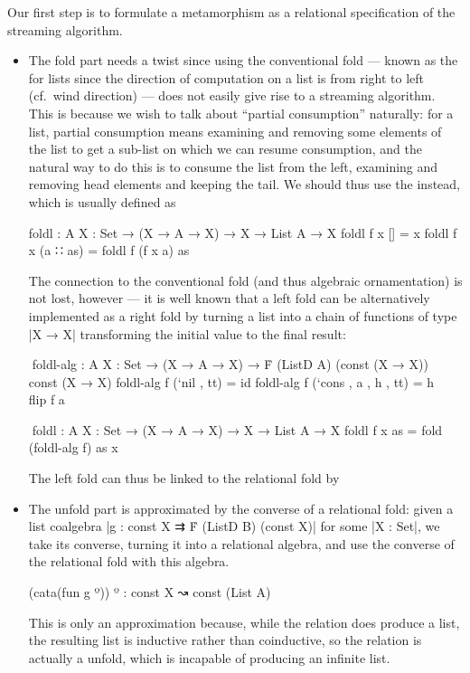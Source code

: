 Our first step is to formulate a metamorphism as a relational specification of the streaming algorithm.
\begin{itemize}
\item The fold part needs a twist since using the conventional fold --- known as the  for lists since the direction of computation on a list is from right to left (cf.~wind direction) --- does not easily give rise to a streaming algorithm.
This is because we wish to talk about ``partial consumption'' naturally: for a list, partial consumption means examining and removing some elements of the list to get a sub-list on which we can resume consumption, and the natural way to do this is to consume the list from the left, examining and removing head elements and keeping the tail.
We should thus use the  instead, which is usually defined as
\begin{code}
foldl : {A X : Set} → (X → A → X) → X → List A → X
foldl f x []        = x
foldl f x (a ∷ as)  = foldl f (f x a) as
\end{code}
The connection to the conventional fold (and thus algebraic ornamentation) is not lost, however --- it is well known that a left fold can be alternatively implemented as a right fold by turning a list into a chain of functions of type |X → X| transforming the initial value to the final result:
\begin{code}
^^^foldl-alg :  {A X : Set} → (X → A → X) →
                Ḟ (ListD A) (const (X → X)) ⇉ const (X → X)
foldl-alg f (`nil   ,          tt) = id
foldl-alg f (`cons  , a , h ,  tt) = h ∘ flip f a

^^^foldl : {A X : Set} → (X → A → X) → X → List A → X
foldl f x as = fold (foldl-alg f) as x
\end{code}
The left fold can thus be linked to the relational fold by
\item The unfold part is approximated by the converse of a relational fold: given a list coalgebra |g : const X ⇉ Ḟ (ListD B) (const X)| for some |X : Set|, we take its converse, turning it into a relational algebra, and use the converse of the relational fold with this algebra.
\begin{code}
(cata(fun g º)) º : const X ↝ const (List A)
\end{code}
This is only an approximation because, while the relation does produce a list, the resulting list is inductive rather than coinductive, so the relation is actually a  unfold, which is incapable of producing an infinite list.
\end{itemize}
